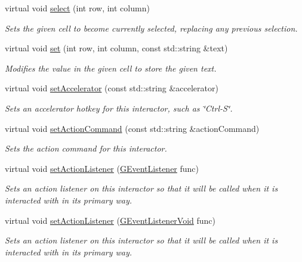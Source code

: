 \begin{DoxyCompactItemize}
virtual void \mbox{\hyperlink{classsgl_1_1GTable_ab06a36d6ed149c8477a1a9d32be2ba43}{select}} (int row, int column)
\begin{DoxyCompactList}\small\item\em Sets the given cell to become currently selected, replacing any previous selection. \end{DoxyCompactList}\item 
virtual void \mbox{\hyperlink{classsgl_1_1GTable_ad1a09eece3a11ef4d2c56a951ae06a69}{set}} (int row, int column, const std\+::string \&text)
\begin{DoxyCompactList}\small\item\em Modifies the value in the given cell to store the given text. \end{DoxyCompactList}\item 
virtual void \mbox{\hyperlink{classsgl_1_1GInteractor_ad15f102f62e2960576012f1aa0ba4b2e}{set\+Accelerator}} (const std\+::string \&accelerator)
\begin{DoxyCompactList}\small\item\em Sets an accelerator hotkey for this interactor, such as \char`\"{}\+Ctrl-\/\+S\char`\"{}. \end{DoxyCompactList}\item 
virtual void \mbox{\hyperlink{classsgl_1_1GInteractor_a4b5843fe3030e038a1ba54cc03389bcf}{set\+Action\+Command}} (const std\+::string \&action\+Command)
\begin{DoxyCompactList}\small\item\em Sets the action command for this interactor. \end{DoxyCompactList}\item 
virtual void \mbox{\hyperlink{classsgl_1_1GInteractor_adcfb4742430c88714fcf57e57ab8ea9c}{set\+Action\+Listener}} (\mbox{\hyperlink{namespacesgl_ae9f3e9eab70035da1a2b114e21357b25}{G\+Event\+Listener}} func)
\begin{DoxyCompactList}\small\item\em Sets an action listener on this interactor so that it will be called when it is interacted with in its primary way. \end{DoxyCompactList}\item 
virtual void \mbox{\hyperlink{classsgl_1_1GInteractor_aebd20a89c7a8a43a6fce999cf4f9fcf2}{set\+Action\+Listener}} (\mbox{\hyperlink{namespacesgl_a54427ce97bb1c2804e4fe2b0a62e8b17}{G\+Event\+Listener\+Void}} func)
\begin{DoxyCompactList}\small\item\em Sets an action listener on this interactor so that it will be called when it is interacted with in its primary way. \end{DoxyCompactList}\item 

\end{DoxyCompactItemize}
